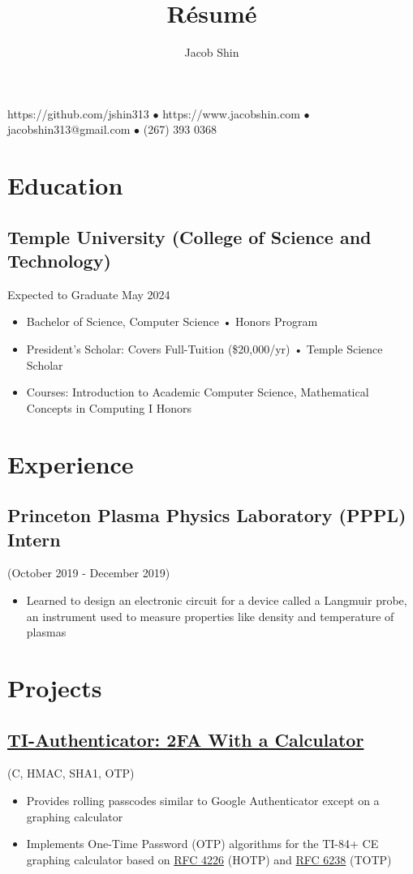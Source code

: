 \documentclass{article}
\makeatletter
\renewcommand{\maketitle}{
    \begin{center}
        {\huge\bfseries
        \theauthor}
    \end{center}
    \begin{center}
        \vspace{1em}
        \leavevmode
        https://github.com/jshin313 $\bullet$ https://www.jacobshin.com $\bullet$ jacobshin313@gmail.com $\bullet$ (267) 393 0368
    \end{center}
}
\makeatother
\begin{document}
\title{R\'esum\'e}
\author{Jacob Shin}

\maketitle
\section{Education}
\subsection{Temple University (College of Science and Technology)}\hspace{4em} Expected to Graduate May 2024
\begin{itemize}
    \item Bachelor of Science, Computer Science • Honors Program
    \item President's Scholar: Covers Full-Tuition (\$20,000/yr) • Temple Science Scholar
    \item Courses: Introduction to Academic Computer Science, Mathematical Concepts in Computing I Honors 
\end{itemize}

\section{Experience}
\subsection{Princeton Plasma Physics Laboratory (PPPL) Intern} (October 2019 - December 2019)
\begin{itemize}
    \item Learned to design an electronic circuit for a device called a Langmuir probe, an instrument used to measure properties like density and temperature of plasmas
\end{itemize}

\section{Projects}
\subsection{\href{https://github.com/jshin313/ti-authenticator}{TI-Authenticator: 2FA With a Calculator}} (C, HMAC, SHA1, OTP)
\begin{itemize}
    \item Provides rolling passcodes similar to Google Authenticator except on a graphing calculator
    \item Implements One-Time Password (OTP) algorithms for the TI-84+ CE graphing calculator based on \href{https://tools.ietf.org/html/rfc4226}{RFC 4226} (HOTP) and \href{https://tools.ietf.org/html/rfc6238}{RFC 6238} (TOTP)
\end{itemize}
\end{document}
